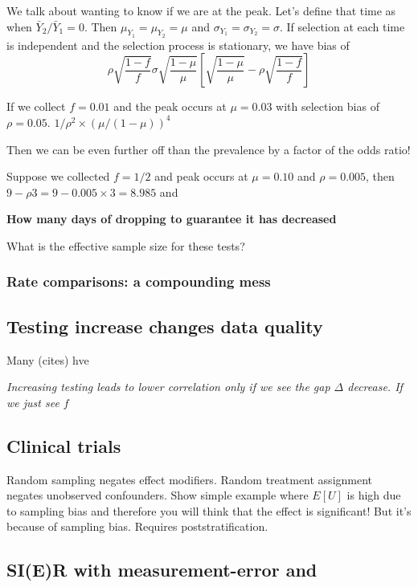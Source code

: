\documentclass[11pt]{article}
\numberwithin{equation}{section}
\theoremstyle{plain}
\begin{document}
We talk about wanting to know if we are at the peak.  Let's define that time as when $\bar Y_2 / \bar Y_1 = 0$.  Then $\mu_{Y_1} = \mu_{Y_2} = \mu$ and $\sigma_{Y_1} = \sigma_{Y_2} = \sigma$. If selection at each time is independent and the selection process is stationary, we have bias of
$$
\rho \sqrt{\frac{1-f}{f}} \sigma \sqrt{\frac{1-\mu}{\mu}} \left[ \sqrt{\frac{1-\mu}{\mu}} - \rho \sqrt{\frac{1-f}{f}} \right ]
$$

If we collect $f = 0.01$ and the peak occurs at $\mu = 0.03$ with selection bias of $\rho = 0.05$. $1/\rho^2 \times (\mu/(1-\mu))^4$

Then we can be even further off than the prevalence by a factor of the odds ratio!

Suppose we collected $f=1/2$ and peak occurs at $\mu = 0.10$ and $\rho = 0.005$, then $9-\rho 3 = 9 - 0.005 \times 3 = 8.985$ and

{\bf How many days of dropping to guarantee it has decreased}

What is the effective sample size for these tests?

\subsubsection{Rate comparisons: a compounding mess}

\subsection{Testing increase changes data quality}

Many (cites) hve

\emph{Increasing testing leads to lower correlation only if we see the gap $\Delta$ decrease.  If we just see $f$ }

\subsection{Clinical trials}

Random sampling negates effect modifiers.  Random treatment assignment negates unobserved confounders.  Show simple example where $E[U]$ is high due to sampling bias and therefore you will think that the effect is significant! But it's because of sampling bias. Requires poststratification.

\subsection{SI(E)R with measurement-error and }
\end{document}
